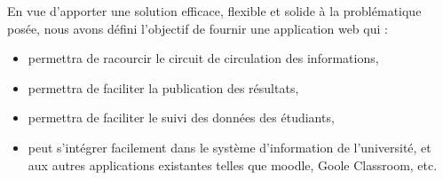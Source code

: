 En vue d'apporter une solution efficace, flexible et solide à la problématique posée, nous avons
défini l'objectif de fournir une application web qui :
\begin{itemize}
    \item permettra de racourcir le circuit de circulation des informations,
    \item permettra de faciliter la publication des résultats,
    \item permettra de faciliter le suivi des données des étudiants,
    \item peut s'intégrer facilement dans le système d'information de l'université, et aux autres applications existantes telles que moodle, Goole Classroom, etc.
\end{itemize}